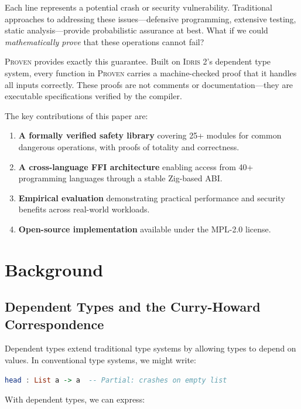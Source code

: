\documentclass[11pt,a4paper]{article}
\newcommand{\proven}{\textsc{Proven}}
\newcommand{\idris}{\textsc{Idris 2}}
\begin{document}
Each line represents a potential crash or security vulnerability. Traditional approaches to addressing these issues—defensive programming, extensive testing, static analysis—provide probabilistic assurance at best. What if we could \emph{mathematically prove} that these operations cannot fail?

\proven{} provides exactly this guarantee. Built on \idris{}'s dependent type system, every function in \proven{} carries a machine-checked proof that it handles all inputs correctly. These proofs are not comments or documentation—they are executable specifications verified by the compiler.

The key contributions of this paper are:

\begin{enumerate}
    \item \textbf{A formally verified safety library} covering 25+ modules for common dangerous operations, with proofs of totality and correctness.

    \item \textbf{A cross-language FFI architecture} enabling access from 40+ programming languages through a stable Zig-based ABI.

    \item \textbf{Empirical evaluation} demonstrating practical performance and security benefits across real-world workloads.

    \item \textbf{Open-source implementation} available under the MPL-2.0 license.
\end{enumerate}

\section{Background}

\subsection{Dependent Types and the Curry-Howard Correspondence}

Dependent types extend traditional type systems by allowing types to depend on values. In conventional type systems, we might write:

\begin{lstlisting}[language=Haskell]
head : List a -> a  -- Partial: crashes on empty list
\end{lstlisting}

With dependent types, we can express:
\end{document}
